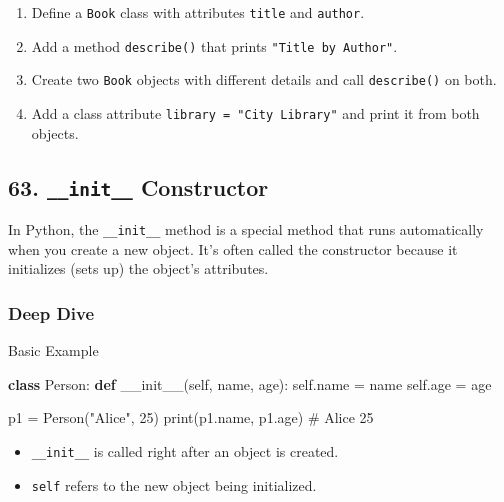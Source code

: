 \documentclass[
  letterpaper,
  DIV=11,
  numbers=noendperiod]{scrreprt}
\newenvironment{Shaded}{\begin{snugshade}}{\end{snugshade}}
\newcommand{\BuiltInTok}[1]{\textcolor[rgb]{0.00,0.23,0.31}{#1}}
\newcommand{\CommentTok}[1]{\textcolor[rgb]{0.37,0.37,0.37}{#1}}
\newcommand{\DecValTok}[1]{\textcolor[rgb]{0.68,0.00,0.00}{#1}}
\newcommand{\FunctionTok}[1]{\textcolor[rgb]{0.28,0.35,0.67}{#1}}
\newcommand{\KeywordTok}[1]{\textcolor[rgb]{0.00,0.23,0.31}{\textbf{#1}}}
\newcommand{\NormalTok}[1]{\textcolor[rgb]{0.00,0.23,0.31}{#1}}
\newcommand{\OperatorTok}[1]{\textcolor[rgb]{0.37,0.37,0.37}{#1}}
\newcommand{\StringTok}[1]{\textcolor[rgb]{0.13,0.47,0.30}{#1}}
\newcommand{\VariableTok}[1]{\textcolor[rgb]{0.07,0.07,0.07}{#1}}
\providecommand{\tightlist}{%
  \setlength{\itemsep}{0pt}\setlength{\parskip}{0pt}}
\begin{document}
\begin{enumerate}
\def\labelenumi{\arabic{enumi}.}
\tightlist
\item
  Define a \texttt{Book} class with attributes \texttt{title} and
  \texttt{author}.
\item
  Add a method \texttt{describe()} that prints
  \texttt{"Title\ by\ Author"}.
\item
  Create two \texttt{Book} objects with different details and call
  \texttt{describe()} on both.
\item
  Add a class attribute \texttt{library\ =\ "City\ Library"} and print
  it from both objects.
\end{enumerate}

\subsection{\texorpdfstring{63. \texttt{\_\_init\_\_}
Constructor}{63. \_\_init\_\_ Constructor}}\label{init__-constructor}

In Python, the \texttt{\_\_init\_\_} method is a special method that
runs automatically when you create a new object. It's often called the
constructor because it initializes (sets up) the object's attributes.

\subsubsection{Deep Dive}\label{deep-dive-62}

Basic Example

\begin{Shaded}
\begin{Highlighting}[]
\KeywordTok{class}\NormalTok{ Person:}
    \KeywordTok{def} \FunctionTok{\_\_init\_\_}\NormalTok{(}\VariableTok{self}\NormalTok{, name, age):}
        \VariableTok{self}\NormalTok{.name }\OperatorTok{=}\NormalTok{ name}
        \VariableTok{self}\NormalTok{.age }\OperatorTok{=}\NormalTok{ age}

\NormalTok{p1 }\OperatorTok{=}\NormalTok{ Person(}\StringTok{"Alice"}\NormalTok{, }\DecValTok{25}\NormalTok{)}
\BuiltInTok{print}\NormalTok{(p1.name, p1.age)   }\CommentTok{\# Alice 25}
\end{Highlighting}
\end{Shaded}

\begin{itemize}
\tightlist
\item
  \texttt{\_\_init\_\_} is called right after an object is created.
\item
  \texttt{self} refers to the new object being initialized.
\end{itemize}
\end{document}
